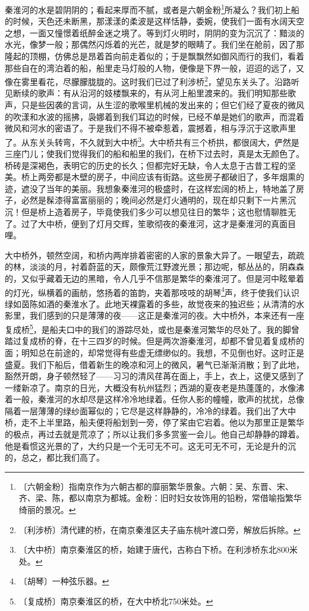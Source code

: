 \documentclass[12pt,UTF-8,openany]{ctexbook}
\begin{document}
\begin{large}
    秦淮河的水是碧阴阴的；看起来厚而不腻，或者是六朝金粉\footnote{〔六朝金粉〕指南京作为六朝古都的靡丽繁华景象。六朝：吴、东晋、宋、齐、梁、陈，都以南京为都城。金粉：旧时妇女妆饰用的铅粉，常借喻指繁华绮丽的景况。}所凝么？我们初上船的时候，天色还未断黑，那漾漾的柔波是这样恬静，委婉，使我们一面有水阔天空之想，一面又憧憬着纸醉金迷之境了。等到灯火明时，阴阴的变为沉沉了：黯淡的水光，像梦一般；那偶然闪烁着的光芒，就是梦的眼睛了。我们坐在舱前，因了那隆起的顶棚，仿佛总是昂着首向前走着似的；于是飘飘然如御风而行的我们，看着那些自在的湾泊着的船，船里走马灯般的人物，便像是下界一般，迢迢的远了，又像在雾里看花，尽朦朦胧胧的。这时我们已过了利涉桥\footnote{〔利涉桥〕清代建的桥，在南京秦淮区夫子庙东桃叶渡口旁，解放后拆除。}，望见东关头了。沿路听见断续的歌声：有从沿河的妓楼飘来的，有从河上船里渡来的。我们明知那些歌声，只是些因袭的言词，从生涩的歌喉里机械的发出来的；但它们经了夏夜的微风的吹漾和水波的摇拂，袅娜着到我们耳边的时候，已经不单是她们的歌声，而混着微风和河水的密语了。于是我们不得不被牵惹着，震撼着，相与浮沉于这歌声里了。从东关头转弯，不久就到大中桥\footnote{〔大中桥〕南京秦淮区的桥，始建于唐代，古称白下桥。在利涉桥东北800米处。}。大中桥共有三个桥拱，都很阔大，俨然是三座门儿；使我们觉得我们的船和船里的我们，在桥下过去时，真是太无颜色了。桥砖是深褐色，表明它的历史的长久；但都完好无缺，令人太息于古昔工程的坚美。桥上两旁都是木壁的房子，中间应该有街路。这些房子都破旧了，多年烟熏的迹，遮没了当年的美丽。我想象秦淮河的极盛时，在这样宏阔的桥上，特地盖了房子，必然是髹漆得富富丽丽的；晚间必然是灯火通明的，现在却只剩下一片黑沉沉！但是桥上造着房子，毕竟使我们多少可以想见往日的繁华；这也慰情聊胜无了。过了大中桥，便到了灯月交辉，笙歌彻夜的秦淮河，这才是秦淮河的真面目哩。
    
    大中桥外，顿然空阔，和桥内两岸排着密密的人家的景象大异了。一眼望去，疏疏的林，淡淡的月，衬着蔚蓝的天，颇像荒江野渡光景；那边呢，郁丛丛的，阴森森的，又似乎藏着无边的黑暗，令人几乎不信那是繁华的秦淮河了。但是河中眩晕着的灯光，纵横着的画舫，悠扬着的笛韵，夹着那吱吱的胡琴\footnote{〔胡琴〕一种弦乐器。}声，终于使我们认识绿如茵陈如酒的秦淮水了。此地天裸露着的多些，故觉夜来的独迟些；从清清的水影里，我们感到的只是薄薄的夜——这正是秦淮河的夜。大中桥外，本来还有一座复成桥\footnote{〔复成桥〕南京秦淮区的桥，在大中桥北750米处。}，是船夫口中的我们的游踪尽处，或也是秦淮河繁华的尽处了。我的脚曾踏过复成桥的脊，在十三四岁的时候。但是两次游秦淮河，却都不曾见着复成桥的面；明知总在前途的，却常觉得有些虚无缥缈似的。我想，不见倒也好。这时正是盛夏。我们下船后，借着新生的晚凉和河上的微风，暑气已渐渐消散；到了此地，豁然开朗，身子顿然轻了——习习的清风荏苒在面上，手上，衣上，这便又感到了一缕新凉了。南京的日光，大概没有杭州猛烈；西湖的夏夜老是热蓬蓬的，水像沸着一般，秦淮河的水却尽是这样冷冷地绿着。任你人影的幢幢，歌声的扰扰，总像隔着一层薄薄的绿纱面幂似的；它尽是这样静静的，冷冷的绿着。我们出了大中桥，走不上半里路，船夫便将船划到一旁，停了桨由它宕着。他以为那里正是繁华的极点，再过去就是荒凉了；所以让我们多多赏鉴一会儿。他自己却静静的蹲着。他是看惯这光景的了，大约只是一个无可无不可。这无可无不可，无论是升的沉的，总之，都比我们高了。
    

\end{large}
\end{document}
